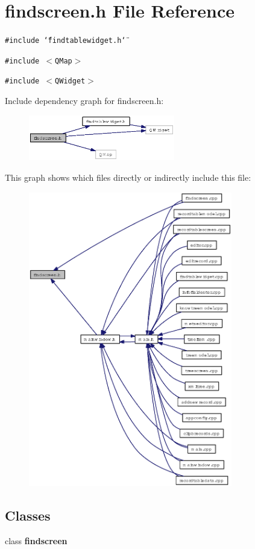 \section{findscreen.h File Reference}
\label{findscreen_8h}
{\tt \#include \char`\"{}findtablewidget.h\char`\"{}}\par
{\tt \#include $<$QMap$>$}\par
{\tt \#include $<$QWidget$>$}\par


Include dependency graph for findscreen.h:\begin{figure}[H]
\begin{center}
\leavevmode
\includegraphics[width=181pt]{findscreen_8h__incl}
\end{center}
\end{figure}


This graph shows which files directly or indirectly include this file:\begin{figure}[H]
\begin{center}
\leavevmode
\includegraphics[width=252pt]{findscreen_8h__dep__incl}
\end{center}
\end{figure}
\subsection*{Classes}
\begin{CompactItemize}
\item 
class {\bf findscreen}
\end{CompactItemize}
